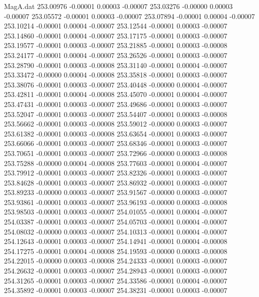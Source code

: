 \begin{filecontents}{MagA.dat}
 253.00976   -0.00001    0.00003   -0.00007
 253.03276   -0.00000    0.00003   -0.00007
 253.05572   -0.00001    0.00003   -0.00007
 253.07894   -0.00001    0.00004   -0.00007
 253.10214   -0.00001    0.00004   -0.00007
 253.12544   -0.00001    0.00003   -0.00007
 253.14860   -0.00001    0.00004   -0.00007
 253.17175   -0.00001    0.00003   -0.00007
 253.19577   -0.00001    0.00003   -0.00007
 253.21885   -0.00001    0.00003   -0.00008
 253.24177   -0.00001    0.00004   -0.00007
 253.26526   -0.00001    0.00003   -0.00007
 253.28790   -0.00001    0.00003   -0.00008
 253.31140   -0.00001    0.00004   -0.00007
 253.33472   -0.00000    0.00004   -0.00008
 253.35818   -0.00001    0.00003   -0.00007
 253.38076   -0.00001    0.00003   -0.00007
 253.40448   -0.00000    0.00004   -0.00007
 253.42811   -0.00001    0.00004   -0.00008
 253.45070   -0.00001    0.00004   -0.00007
 253.47431   -0.00001    0.00003   -0.00007
 253.49686   -0.00001    0.00003   -0.00007
 253.52047   -0.00001    0.00003   -0.00007
 253.54407   -0.00001    0.00003   -0.00008
 253.56662   -0.00001    0.00003   -0.00008
 253.59012   -0.00000    0.00003   -0.00007
 253.61382   -0.00001    0.00003   -0.00008
 253.63654   -0.00001    0.00003   -0.00007
 253.66066   -0.00001    0.00003   -0.00007
 253.68346   -0.00001    0.00003   -0.00007
 253.70651   -0.00001    0.00003   -0.00007
 253.72966   -0.00000    0.00003   -0.00008
 253.75288   -0.00000    0.00004   -0.00008
 253.77603   -0.00001    0.00004   -0.00007
 253.79912   -0.00001    0.00003   -0.00007
 253.82326   -0.00001    0.00003   -0.00007
 253.84628   -0.00001    0.00003   -0.00007
 253.86932   -0.00001    0.00003   -0.00007
 253.89233   -0.00000    0.00003   -0.00007
 253.91567   -0.00000    0.00003   -0.00007
 253.93861   -0.00001    0.00003   -0.00007
 253.96193   -0.00000    0.00003   -0.00008
 253.98503   -0.00001    0.00003   -0.00007
 254.01055   -0.00001    0.00004   -0.00007
 254.03387   -0.00001    0.00003   -0.00007
 254.05703   -0.00001    0.00004   -0.00007
 254.08032   -0.00000    0.00003   -0.00007
 254.10313   -0.00001    0.00004   -0.00007
 254.12643   -0.00001    0.00003   -0.00007
 254.14941   -0.00001    0.00004   -0.00008
 254.17275   -0.00001    0.00004   -0.00008
 254.19593   -0.00000    0.00003   -0.00008
 254.22015   -0.00000    0.00003   -0.00008
 254.24333   -0.00001    0.00003   -0.00007
 254.26632   -0.00001    0.00003   -0.00007
 254.28943   -0.00001    0.00003   -0.00007
 254.31265   -0.00001    0.00003   -0.00007
 254.33586   -0.00001    0.00004   -0.00007
 254.35892   -0.00001    0.00003   -0.00007
 254.38231   -0.00001    0.00003   -0.00007

\end{filecontents}
